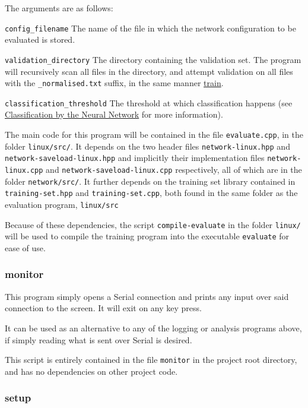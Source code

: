 \documentclass[a4paper]{article}
\begin{document}
The arguments are as follows:

\lstinline{config_filename} The name of the file in which the network configuration to be evaluated is stored.

\lstinline{validation_directory} The directory containing the validation set. The program will recursively scan all files in the directory, and attempt validation on all files with the \lstinline{_normalised.txt} suffix, in the same manner \hyperref[subsubsec:dc_csa_train]{train}.

\lstinline{classification_threshold} The threshold at which classification happens (see \hyperref[subsec:dc_classification]{Classification by the Neural Network} for more information).

The main code for this program will be contained in the file \lstinline{evaluate.cpp}, in the folder \lstinline{linux/src/}. It depends on the two header files \lstinline{network-linux.hpp} and \lstinline{network-saveload-linux.hpp} and implicitly their implementation files \lstinline{network-linux.cpp} and \lstinline{network-saveload-linux.cpp} respectively, all of which are in the folder \lstinline{network/src/}. It further depends on the training set library contained in \lstinline{training-set.hpp} and \lstinline{training-set.cpp}, both found in the same folder as the evaluation program, \lstinline{linux/src}

Because of these dependencies, the script \lstinline{compile-evaluate} in the folder \lstinline{linux/} will be used to compile the training program into the executable \lstinline{evaluate} for ease of use.

\subsubsection{monitor}
\label{subsubsec:dc_csa_monitor}

This program simply opens a Serial connection and prints any input over said connection to the screen. It will exit on any key press.

It can be used as an alternative to any of the logging or analysis programs above, if simply reading what is sent over Serial is desired.

This script is entirely contained in the file \lstinline{monitor} in the project root directory, and has no dependencies on other project code.

\subsubsection{setup}
\end{document}
